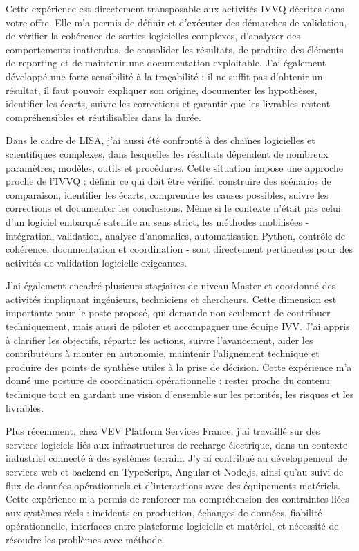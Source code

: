 \documentclass[11pt,a4paper]{altacv}
\begin{document}
{Cette expérience est directement transposable aux activités IVVQ décrites dans votre offre. Elle m'a permis de définir et d'exécuter des démarches de validation, de vérifier la cohérence de sorties logicielles complexes, d'analyser des comportements inattendus, de consolider les résultats, de produire des éléments de reporting et de maintenir une documentation exploitable. J'ai également développé une forte sensibilité à la traçabilité : il ne suffit pas d'obtenir un résultat, il faut pouvoir expliquer son origine, documenter les hypothèses, identifier les écarts, suivre les corrections et garantir que les livrables restent compréhensibles et réutilisables dans la durée.

Dans le cadre de LISA, j'ai aussi été confronté à des chaînes logicielles et scientifiques complexes, dans lesquelles les résultats dépendent de nombreux paramètres, modèles, outils et procédures. Cette situation impose une approche proche de l'IVVQ : définir ce qui doit être vérifié, construire des scénarios de comparaison, identifier les écarts, comprendre les causes possibles, suivre les corrections et documenter les conclusions. Même si le contexte n'était pas celui d'un logiciel embarqué satellite au sens strict, les méthodes mobilisées - intégration, validation, analyse d'anomalies, automatisation Python, contrôle de cohérence, documentation et coordination - sont directement pertinentes pour des activités de validation logicielle exigeantes.

J'ai également encadré plusieurs stagiaires de niveau Master et coordonné des activités impliquant ingénieurs, techniciens et chercheurs. Cette dimension est importante pour le poste proposé, qui demande non seulement de contribuer techniquement, mais aussi de piloter et accompagner une équipe IVV. J'ai appris à clarifier les objectifs, répartir les actions, suivre l'avancement, aider les contributeurs à monter en autonomie, maintenir l'alignement technique et produire des points de synthèse utiles à la prise de décision. Cette expérience m'a donné une posture de coordination opérationnelle : rester proche du contenu technique tout en gardant une vision d'ensemble sur les priorités, les risques et les livrables.

Plus récemment, chez VEV Platform Services France, j'ai travaillé sur des services logiciels liés aux infrastructures de recharge électrique, dans un contexte industriel connecté à des systèmes terrain. J'y ai contribué au développement de services web et backend en TypeScript, Angular et Node.js, ainsi qu'au suivi de flux de données opérationnels et d'interactions avec des équipements matériels. Cette expérience m'a permis de renforcer ma compréhension des contraintes liées aux systèmes réels : incidents en production, échanges de données, fiabilité opérationnelle, interfaces entre plateforme logicielle et matériel, et nécessité de résoudre les problèmes avec méthode.

}
\end{document}
